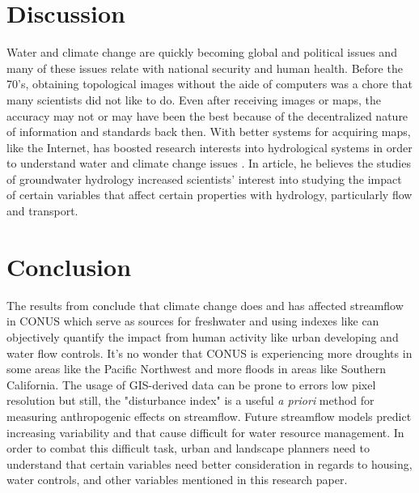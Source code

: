 \documentclass[a4paper,man,biblatex]{apa7}
\begin{document}
\section{Discussion} Water and climate change are quickly becoming global and political issues and many of these issues relate with national security and human health. Before the 70's, obtaining topological images without the aide of computers was a chore that many scientists did not like to do. Even after receiving images or maps, the accuracy may not or may have been the best because of the decentralized nature of information and standards back then. With better systems for acquiring maps, like the Internet, has boosted research interests into hydrological systems in order to understand water and climate change issues \autocite{bras_1999}. In \textcite{bras_1999} article, he believes the studies of groundwater hydrology increased scientists' interest into studying the impact of certain variables that affect certain properties with hydrology, particularly flow and transport.\\
\section{Conclusion} The results from \textcite{rice_2016} conclude that climate change does and has affected streamflow in CONUS which serve as sources for freshwater and using indexes like \textcite{falcone_2016} can objectively quantify the impact from human activity like urban developing and water flow controls. It's no wonder that CONUS is experiencing more droughts in some areas like the Pacific Northwest and more floods in areas like Southern California. The usage of GIS-derived data can be prone to errors low pixel resolution but still, the "disturbance index" is a useful \textit{a priori} method for measuring anthropogenic effects on streamflow. Future streamflow models predict increasing variability and that cause difficult for water resource management. In order to combat this difficult task, urban and landscape planners need to understand that certain variables need better consideration in regards to housing, water controls, and other variables mentioned in this research paper. \\
\printbibliography
\end{document}
